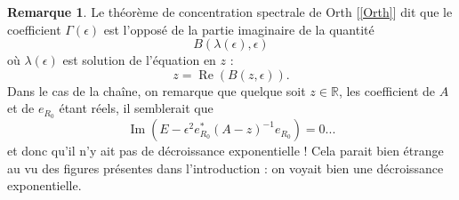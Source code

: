 \documentclass[12pt,openany,a4paper, titlepage]{article}
\newcommand{\lp}{\left(}
\newcommand{\rp}{\right)}
\newcommand{\R}{\mathbb{R}}
\theoremstyle{definition}
\theoremstyle{definition}
\theoremstyle{definition}
\theoremstyle{definition}
\theoremstyle{definition}
\newtheorem{rem}{Remarque}
\theoremstyle{definition}
\begin{document}
\begin{rem}
Le théorème de concentration spectrale de Orth [\ref{Orth}] dit que le coefficient $\Gamma(\epsilon)$ est l'opposé de la partie imaginaire de la quantité 
\begin{equation}
    B(\lambda(\epsilon),\epsilon)
\end{equation}
où $\lambda(\epsilon)$ est solution de l'équation en $z$ :
\begin{equation}
    z = \operatorname{Re}(B(z,\epsilon)).
\end{equation}
Dans le cas de la chaîne, on remarque que quelque soit $z\in\R$, les coefficient de $A$ et de $e_{R_0}$ étant réels, il semblerait que 
\begin{equation}
    \operatorname{Im}\lp E - \epsilon^2 e_{R_0}^*(A-z)^{-1}e_{R_0}\rp = 0...
\end{equation}
et donc qu'il n'y ait pas de décroissance exponentielle ! Cela parait bien étrange au vu des figures présentes dans l'introduction : on voyait bien une décroissance exponentielle.  \\


\end{rem}
\end{document}
